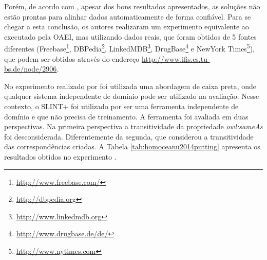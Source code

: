 Porém, de acordo com , apesar dos bons resultados apresentados, as soluções não estão prontas para alinhar dados automaticamente de forma confiável. Para se chegar a esta conclusão, os autores realizaram um experimento equivalente ao executado pela OAEI, mas utilizando dados reais, que foram obtidos de 5 fontes diferentes (Freebase\footnote{\url{http://www.freebase.com/}}, DBPedia\footnote{\url{http://dbpedia.org}}, LinkedMDB\footnote{\url{http://www.linkedmdb.org}}, DrugBase\footnote{\url{http://www.drugbase.de/de/}} e NewYork Times\footnote{\url{http://www.nytimes.com}}), que podem ser obtidos através do endereço \url{http://www.ifis.cs.tu-bs.de/node/2906}.

No experimento realizado por  foi utilizada uma abordagem de caixa preta, onde qualquer sistema independente de domínio pode ser utilizado na avaliação. Nesse contexto, o SLINT+ \cite{nguyen2012interlinking} foi utilizado por ser uma ferramenta independente de domínio e que não precisa de treinamento. A ferramenta foi avaliada em duas perspectivas. Na primeira perspectiva a transitividade da propriedade \textit{owl:sameAs} foi desconsiderada. Diferentemente da segunda, que considerou a transitividade das correspondências criadas. A Tabela \ref{tab:homoceanu2014putting} apresenta os resultados obtidos no experimento \cite{homoceanu2014putting}.

